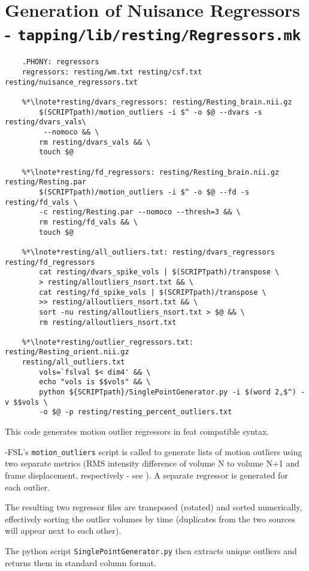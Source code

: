 \section{Generation of Nuisance Regressors - \texttt{tapping/lib/resting/Regressors.mk}}
\begin{lstlisting}
	.PHONY: regressors
	regressors: resting/wm.txt resting/csf.txt resting/nuisance_regressors.txt
	
	%*\lnote*resting/dvars_regressors: resting/Resting_brain.nii.gz
		$(SCRIPTpath)/motion_outliers -i $^ -o $@ --dvars -s resting/dvars_vals\
		 --nomoco && \
		rm resting/dvars_vals && \
		touch $@
	
	%*\lnote*resting/fd_regressors: resting/Resting_brain.nii.gz resting/Resting.par
		$(SCRIPTpath)/motion_outliers -i $^ -o $@ --fd -s resting/fd_vals \
		-c resting/Resting.par --nomoco --thresh=3 && \
		rm resting/fd_vals && \
		touch $@
	
	%*\lnote*resting/all_outliers.txt: resting/dvars_regressors resting/fd_regressors
		cat resting/dvars_spike_vols | $(SCRIPTpath)/transpose \
		> resting/alloutliers_nsort.txt && \
		cat resting/fd_spike_vols | $(SCRIPTpath)/transpose \
		>> resting/alloutliers_nsort.txt && \
		sort -nu resting/alloutliers_nsort.txt > $@ && \
		rm resting/alloutliers_nsort.txt
	
	%*\lnote*resting/outlier_regressors.txt: resting/Resting_orient.nii.gz 
	resting/all_outliers.txt
		vols=`fslval $< dim4' && \
		echo "vols is $$vols" && \
		python ${SCRIPTpath}/SinglePointGenerator.py -i $(word 2,$^) -v $$vols \
		-o $@ -p resting/resting_percent_outliers.txt
\end{lstlisting}

This code generates motion outlier regressors in feat compatible syntax.

\lnum{27}-\lnum{28}FSL's \texttt{motion_outliers} script is called to generate lists of motion outliers using two separate metrics (RMS intensity difference of volume N to volume N+1 and frame displacement, respectively - see \citep{powerspurious2012}). A separate regressor is generated for each outlier.

\lnum{29}The resulting two regressor files are transposed (rotated) and sorted numerically, effectively sorting the outlier volumes by time (duplicates from the two sources will appear next to each other).

\lnum{30}The python script \texttt{SinglePointGenerator.py} then extracts unique outliers and returns them in standard column format.

